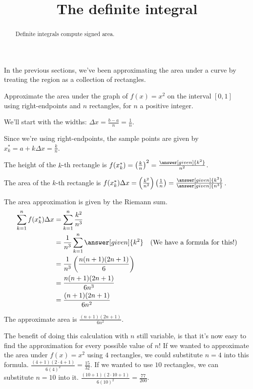 \documentclass{ximera}
\title[Dig-In:]{The definite integral}
\begin{document}
\begin{abstract}
  Definite integrals compute signed area.
\end{abstract}
\maketitle


In the previous sections, we've been approximating the area under a curve by treating the region as a collection of
rectangles. 

\begin{example}
	Approximate the area under the graph of $f(x)=x^2$ on the interval $[0,1]$ using right-endpoints and $n$ rectangles, for $n$ a positive integer.
	\begin{explanation}
		We'll start with the widths: $\Delta x = \frac{b-a}{n} = \frac{1}{n}$.
		
		Since we're using right-endpoints, the sample points are given by $x_k^* = a + k \Delta x = \frac{k}{n}$.
		
		The height of the $k$-th rectangle is $f(x_k^*) = \left( \frac{k}{n} \right)^2 = \frac{\answer[given]{k^2}}{n^2}$.
		
		The area of the $k$-th rectangle is $f(x_k^*)\Delta x = \left(\frac{k^2}{n^2}\right)\left( \frac{1}{n} \right) = \frac{\answer[given]{k^2}}{\answer[given]{n^3}}$.
		
		The area approximation is given by the Riemann sum.
		\begin{align*}
			\sum_{k=1}^{n} f(x_k^*) \Delta x &= \sum_{k=1}^n \frac{k^2}{n^3}\\
				&= \frac{1}{n^3} \sum_{k=1}^{n} \answer[given]{k^2} \quad \text{(We have a formula for this!)}\\
				&= \frac{1}{n^3} \left( \frac{n(n+1)(2n+1)}{6}\right)\\
				&= \frac{n(n+1)(2n+1)}{6n^3}\\
				&= \frac{(n+1)(2n+1)}{6n^2}
		\end{align*}

		The approximate area is $\frac{(n+1)(2n+1)}{6n^2}$.
	\end{explanation}
\end{example}

The benefit of doing this calculation with $n$ still variable, is that it's now easy to find the approximation for every possible value of $n$!
If we wanted to approximate the area under $f(x)=x^2$ using $4$ rectangles, we could substitute $n=4$ into this formula.
$\frac{(4+1)(2\cdot4+1)}{6(4)^2} = \frac{15}{32}$.  If we wanted to use $10$ rectangles, we can substitute $n=10$ into it.
$\frac{(10+1)(2\cdot 10+1)}{6(10)^2} = \frac{77}{200}$.
\end{document}
